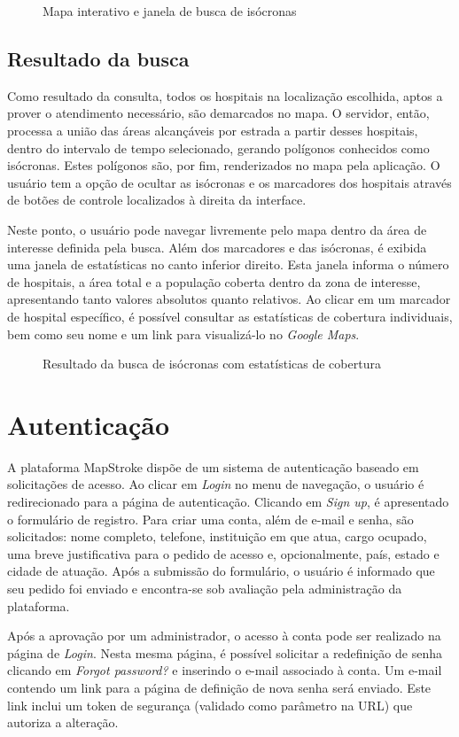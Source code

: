 \documentclass{article}
\newcommand{\image}[2]{
    \begin{figure}[H]
        \fcolorbox{light-gray}{white}{\texttt{[image: \#1]}}
        \caption{#2}
    \end{figure}
}
\begin{document}
\image{01.png}{Mapa interativo e janela de busca de isócronas}

\subsection{Resultado da busca}

Como resultado da consulta, todos os hospitais na localização escolhida, aptos a prover o atendimento necessário, são demarcados no mapa. O servidor, então, processa a união das áreas alcançáveis por estrada a partir desses hospitais, dentro do intervalo de tempo selecionado, gerando polígonos conhecidos como isócronas. Estes polígonos são, por fim, renderizados no mapa pela aplicação. O usuário tem a opção de ocultar as isócronas e os marcadores dos hospitais através de botões de controle localizados à direita da interface.

Neste ponto, o usuário pode navegar livremente pelo mapa dentro da área de interesse definida pela busca. Além dos marcadores e das isócronas, é exibida uma janela de estatísticas no canto inferior direito. Esta janela informa o número de hospitais, a área total e a população coberta dentro da zona de interesse, apresentando tanto valores absolutos quanto relativos. Ao clicar em um marcador de hospital específico, é possível consultar as estatísticas de cobertura individuais, bem como seu nome e um link para visualizá-lo no \textit{Google Maps}.

\image{02.png}{Resultado da busca de isócronas com estatísticas de cobertura}

\section{Autenticação}

A plataforma MapStroke dispõe de um sistema de autenticação baseado em solicitações de acesso. Ao clicar em \textit{Login} no menu de navegação, o usuário é redirecionado para a página de autenticação. Clicando em \textit{Sign up}, é apresentado o formulário de registro. Para criar uma conta, além de e-mail e senha, são solicitados: nome completo, telefone, instituição em que atua, cargo ocupado, uma breve justificativa para o pedido de acesso e, opcionalmente, país, estado e cidade de atuação. Após a submissão do formulário, o usuário é informado que seu pedido foi enviado e encontra-se sob avaliação pela administração da plataforma.

Após a aprovação por um administrador, o acesso à conta pode ser realizado na página de \textit{Login}. Nesta mesma página, é possível solicitar a redefinição de senha clicando em \textit{Forgot password?} e inserindo o e-mail associado à conta. Um e-mail contendo um link para a página de definição de nova senha será enviado. Este link inclui um token de segurança (validado como parâmetro na URL) que autoriza a alteração.
\end{document}
